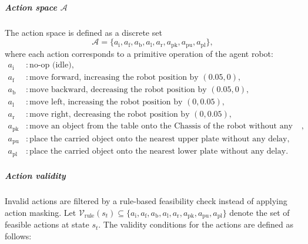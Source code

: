\documentclass[english, 12pt, a4paper, elec, utf8, a-2b, online]{aaltothesis}
\begin{document}
\subparagraph{Action space $\mathcal{A}$}
The action space is defined as a discrete set
\begin{equation}
\mathcal{A} = \{a_{\text{i}}, a_{\text{f}}, a_{\text{b}}, a_{\text{l}}, a_{\text{r}}, a_{\text{pk}}, a_{\text{pu}}, a_{\text{pl}}\},
\end{equation}
where each action corresponds to a primitive operation of the agent robot:
\begin{align*}
a_{\text{i}} &: \text{no-op (idle)}, \\
a_{\text{f}} &: \text{move forward, increasing the robot position by } (0.05, 0), \\
a_{\text{b}} &: \text{move backward, decreasing the robot position by } (0.05, 0), \\
a_{\text{l}} &: \text{move left, increasing the robot position by } (0, 0.05), \\
a_{\text{r}} &: \text{move right, decreasing the robot position by } (0, 0.05), \\
a_{\text{pk}} &: \text{move an object from the table onto the Chassis of the robot without any delay}, \\
a_{\text{pu}} &: \text{place the carried object onto the nearest upper plate without any delay}, \\
a_{\text{pl}} &: \text{place the carried object onto the nearest lower plate without any delay}.
\end{align*}

\subparagraph{Action validity}
Invalid actions are filtered by a rule-based feasibility check instead of applying action masking.  
Let $\mathcal{V}_{\text{rule}}(s_t) \subseteq \{a_{\text{i}}, a_{\text{f}}, a_{\text{b}}, a_{\text{l}}, a_{\text{r}}, a_{\text{pk}}, a_{\text{pu}}, a_{\text{pl}}\}$ denote the set of feasible actions at state $s_t$.  
The validity conditions for the actions are defined as follows:
\end{document}
